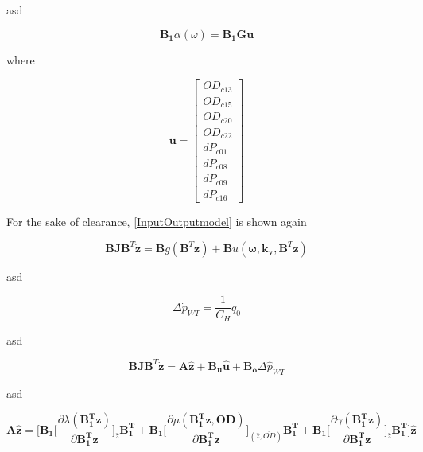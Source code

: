asd

\begin{equation}
  \pmb{B_1} \alpha(\omega) = \pmb{B_1} \pmb{G} \pmb{u}
\label{gamma_lin}
\end{equation}

where 

\begin{equation}
\pmb{u} =
\begin{bmatrix} 
OD_{c13} \\
OD_{c15} \\
OD_{c20} \\
OD_{c22} \\
dP_{c01} \\
dP_{c08} \\
dP_{c09} \\
dP_{c16} 
\label{inputvector}
\end{bmatrix} 
\end{equation}



For the sake of clearance, \eqref{InputOutputmodel} is shown again  

\begin{equation}
 \pmb{B}\pmb{J {B}}^T \pmb{\dot{z}} = \pmb{B} g(\pmb{B}^T \pmb{z})+ \pmb{B} u(\pmb{\omega},\pmb{k_v	}, \pmb{B}^T \pmb{z})
 \label{InputOutputmodel}
\end{equation}

asd

\begin{equation}
\Delta \dot{p}_{WT} = \frac{1}{C_H} q_0
 \label{WT_eq}
\end{equation}

asd

\begin{equation}
 \pmb{B}\pmb{J {B}}^T \pmb{\dot{z}} = \pmb{A} \pmb{\hat{z}} + \pmb{B_u} \pmb{\hat{u}} + \pmb{B_o} \Delta \hat{p}_{WT}    
 \label{statespace_1}
\end{equation}

asd

\begin{equation}
  \pmb{A}\pmb{\hat{z}} = \bigg[\pmb{B_1} \bigg[ \frac{\partial{\lambda(\pmb{{B_1^{T}}}\pmb{z})}}{{\partial{\pmb{{B_1^{T}}}\pmb{z}}}}   \bigg]_{\bar{z}} \pmb{{B_1^{T}}} +  \pmb{B_1} \bigg[ \frac{\partial{\mu(\pmb{{B_1^{T}}}\pmb{z}, \pmb{OD})}}{{\partial{\pmb{{B_1^{T}}}\pmb{z}}}}  \bigg]_{(\bar{z}, \bar{OD})} \pmb{{B_1^{T}}} +  \pmb{B_1} \bigg[ \frac{\partial{\gamma(\pmb{{B_1^{T}}}\pmb{z})}}{{\partial{\pmb{{B_1^{T}}}\pmb{z}}}}   \bigg]_{\bar{z}} \pmb{{B_1^{T}}}\bigg] \pmb{\hat{z}} 
\label{Amatrix}
\end{equation}

